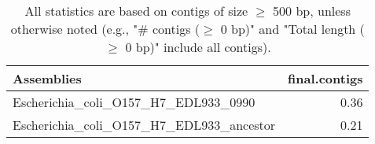 \documentclass[12pt,a4paper]{article}
\begin{document}
\begin{table}[ht]
\begin{center}
\caption{All statistics are based on contigs of size $\geq$ 500 bp, unless otherwise noted (e.g., "\# contigs ($\geq$ 0 bp)" and "Total length ($\geq$ 0 bp)" include all contigs).}
\begin{tabular}{|l*{1}{|r}|}
\hline
Assemblies & final.contigs \\ \hline
Escherichia\_coli\_O157\_H7\_EDL933\_0990 & 0.36 \\ \hline
Escherichia\_coli\_O157\_H7\_EDL933\_ancestor & 0.21 \\ \hline
\end{tabular}
\end{center}
\end{table}
\end{document}
